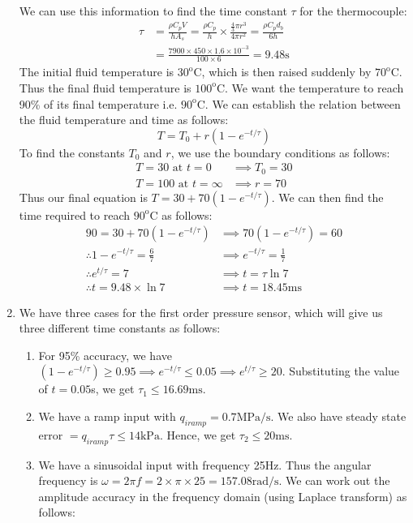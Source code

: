 \documentclass[a4paper, 11pt]{article}
\begin{document}
\begin{enumerate}[label=(\arabic*),leftmargin=*]
	We can use this information to find the time constant $\tau$ for the thermocouple:
	\begin{align*}
	\tau&=\frac{\rho C_pV}{hA_s}=\frac{\rho C_p}{h}\times\frac{\frac{4}{3}\pi r^3}{4\pi r^2}=\frac{\rho C_pd_b}{6h}\\
	&=\frac{7900\times 450\times 1.6\times 10^{-3}}{100\times 6}=9.48\text{s}
	\end{align*}
	The initial fluid temperature is $30^{\text{o}}\text{C}$, which is then raised suddenly by $70^{\text{o}}\text{C}$. Thus the final fluid temperature is $100^{\text{o}}\text{C}$. We want the temperature to reach 90\% of its final temperature i.e. $90^{\text{o}}\text{C}$. We can establish the relation between the fluid temperature and time as follows:
	$$T=T_0+r(1-e^{-t/\tau})$$
To find the constants $T_0$ and $r$, we use the boundary conditions as follows:
\begin{align*}
	T=30\text{ at }t=0&\implies T_0=30\\
	T=100\text{ at }t=\infty&\implies r=70
\end{align*}
Thus our final equation is $T=30+70(1-e^{-t/\tau})$. We can then find the time required to reach $90^{\text{o}}\text{C}$ as follows:
\begin{align*}
	90=30+70(1-e^{-t/\tau})&\implies 70(1-e^{-t/\tau})=60\\
	\therefore 1-e^{-t/\tau}=\frac{6}{7}&\implies e^{-t/\tau}=\frac{1}{7}\\
	\therefore e^{t/\tau}=7&\implies t=\tau\ln 7\\
	\therefore t=9.48\times\ln 7&\implies \boxed{t=18.45\text{ms}}
\end{align*}
	\newpage
	\item We have three cases for the first order pressure sensor, which will give us three different time constants as follows:
\begin{enumerate}[label=\Roman*)]
	\item For 95\% accuracy, we have $(1-e^{-t/\tau})\geqslant 0.95\implies e^{-t/\tau}\leqslant 0.05\implies e^{t/\tau}\geqslant 20$. Substituting the value of $t=0.05$s, we get $\tau_1\leqslant 16.69\text{ms}$.
	\item We have a ramp input with $q_{iramp}=0.7\text{MPa/s}$. We also have steady state error $=q_{iramp}\tau\leqslant 14\text{kPa}$. Hence, we get $\tau_2\leqslant 20\text{ms}$.
	\item We have a sinusoidal input with frequency 25Hz. Thus the angular frequency is $\omega=2\pi f=2\times\pi\times 25=157.08\text{rad/s}$. We can work out the amplitude accuracy in the frequency domain (using Laplace transform) as follows:

\end{enumerate}
\end{enumerate}
\end{document}
